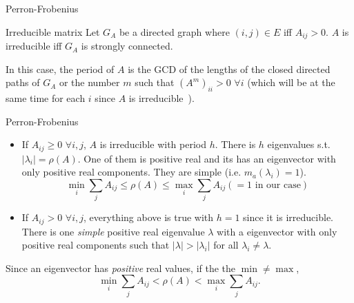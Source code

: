 \documentclass[10pt]{beamer}
\begin{document}
\begin{frame}[allowframebreaks]{Perron-Frobenius}
  \begin{block}{Irreducible matrix}
    Let $G_A$ be a directed graph where $(i,j) \in E$ iff $A_{ij} > 0$.
    $A$ is irreducible iff $G_A$ is strongly connected.

    In this case, the period of $A$ is the GCD of the lengths of the closed directed paths
    of $G_A$ or the number $m$ such that $(A^m)_{ii} > 0$ $\forall i$
    (which will be at the same time for each $i$ since $A$ is irreducible~\cite{kitchens1998symbolic}).
  \end{block}
  \begin{block}{Perron-Frobenius}
    \begin{itemize}
      \item If $A_{ij} \geq 0$ $\forall i,j$, $A$ is irreducible with period $h$.
        There is $h$ eigenvalues s.t. $|\lambda_i| = \rho(A)$.
        One of them is positive real and its has an eigenvector with only positive real components.
        They are simple (i.e. $m_a(\lambda_i) = 1$).
        \[ \min_i \sum_j A_{ij} \leq \rho(A) \leq \max_i \sum_j A_{ij} (= 1 \text{ in our case}) \]
      \item If $A_{ij} > 0$ $\forall i,j$, everything above is true with $h=1$ since it is irreducible.
        There is one \emph{simple} positive real eigenvalue $\lambda$ with a eigenvector with only positive real components
        such that $|\lambda| > |\lambda_i|$ for all $\lambda_i \neq \lambda$.
    \end{itemize}
    Since an eigenvector has \emph{positive} real values, if the the $\min \neq \max$,
    \[ \min_i \sum_j A_{ij} < \rho(A) < \max_i \sum_j A_{ij}. \]
  \end{block}
\end{frame}
\end{document}
